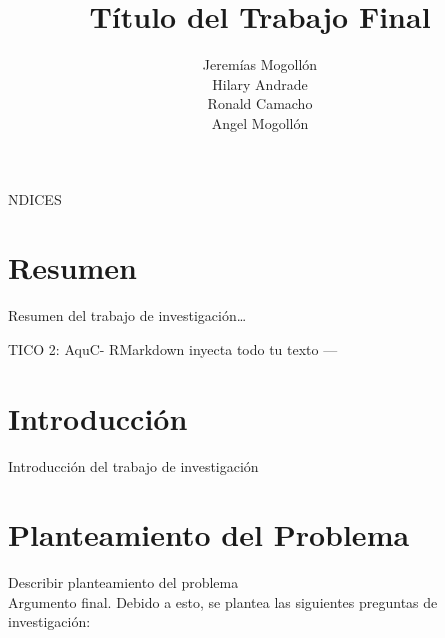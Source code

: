 \documentclass[oneside,11pt]{Latex/Classes/PhDthesisPSnPDF}
\title{Título del Trabajo Final}
\author{Jeremías Mogollón \\ Hilary Andrade \\ Ronald Camacho \\ Angel
Mogollón}
\begin{document}
\maketitle

\frontmatter


NDICES                         %
\setcounter{secnumdepth}{3}
\setcounter{tocdepth}{3}

\tableofcontents



\cleardoublepage

  \cleardoublepage       %
  \chapter*{Resumen}     %
  
  Resumen del trabajo de
investigación\ldots{}             %
  
  \cleardoublepage

\mainmatter
\def\baselinestretch{1.5}

TICO 2: AquC- RMarkdown inyecta todo tu texto ---
\chapter*{Introducción}

Introducción del trabajo de investigación

\chapter{Planteamiento del Problema}

Describir planteamiento del problema\\

Argumento final. Debido a esto, se plantea las siguientes preguntas de
investigación:\\
\end{document}

